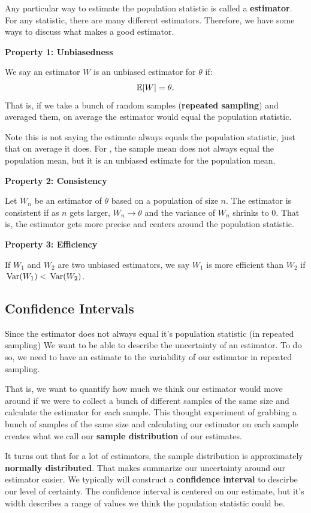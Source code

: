 \documentclass[12pt]{article}
\begin{document}
Any particular way to estimate the population statistic is called a \textbf{estimator}. For any statistic, there are many different estimators. Therefore, we have some ways to discuss what makes a good estimator.

\textbf{Property 1: \textbf{Unbiasedness}}

We say an estimator $W$ is an unbiased estimator for $\theta$ if:
$$
  \expec{W} = \theta.
$$
That is, if we take a bunch of random samples (\textbf{repeated sampling}) and averaged them, on average the estimator would equal the population statistic.

Note this is not saying the estimate always equals the population statistic, just that on average it does. For , the sample mean does not always equal the population mean, but it is an unbiased estimate for the population mean.

\textbf{Property 2: \textbf{Consistency}}

Let $W_n$ be an estimator of $\theta$ based on a population of size $n$. The estimator is consistent if as $n$ gets larger, $W_n \to \theta$ and the variance of $W_n$ shrinks to 0. That is, the estimator gets more precise and centers around the population statistic.

\textbf{Property 3: \textbf{Efficiency}}

If $W_1$ and $W_2$ are two unbiased estimators, we say $W_1$ is more efficient than $W_2$ if $\var{W_1} < \var{W_2}$.


\subsection*{Confidence Intervals}

Since the estimator does not always equal it's population statistic (in repeated sampling) We want to be able to describe the uncertainty of an estimator. To do so, we need to have an estimate to the variability of our estimator in repeated sampling.

That is, we want to quantify how much we think our estimator would move around if we were to collect a bunch of different samples of the same size and calculate the estimator for each sample. This thought experiment of grabbing a bunch of samples of the same size and calculating our estimator on each sample creates what we call our \textbf{sample distribution} of our estimates.


It turns out that for a lot of estimators, the sample distribution is approximately \textbf{normally distributed}. That makes summarize our uncertainty around our estimator easier. We typically will construct a \textbf{confidence interval} to descirbe our level of certainty. The confidence interval is centered on our estimate, but it's width describes a range of values we think the population statistic could be.
\end{document}
